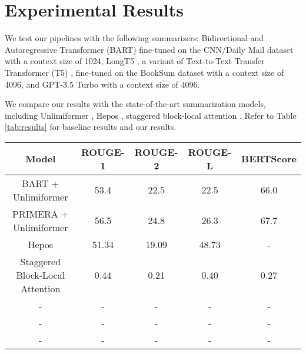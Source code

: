 \section{Experimental Results}

We test our pipelines with the following summarizers: Bidirectional and
Autoregressive Transformer (BART) \cite{lewis-etal-2020-bart} fine-tuned on the
CNN/Daily Mail dataset \cite{nallapati2016abstractive} with a context size of 1024,
LongT5 \cite{guo2021longt5}, a variant of Text-to-Text Transfer Transformer (T5)
\cite{raffel2020exploring}, fine-tuned on the BookSum dataset with a context size
of 4096, and GPT-3.5 Turbo \cite{brown2020language} with a context size of 4096.

We compare our results with the state-of-the-art summarization models, including
Unlimiformer \cite{bertsch2023unlimiformer}, Hepos \cite{huang-etal-2021-efficient},
staggered block-local attention \cite{phang2022investigating}.
Refer to Table \ref{tab:results} for baseline results and our results.

\begin{table*}[!ht]
	\centering

	\begin{tabular}{c c c c c}
		\hline
		\textbf{Model} & \textbf{ROUGE-1} & \textbf{ROUGE-2} & \textbf{ROUGE-L} & \textbf{BERTScore} \\
		\hline
		BART + Unlimiformer & 53.4 & 22.5 & 22.5 & 66.0 \\
		PRIMERA + Unlimiformer & 56.5 & 24.8 & 26.3 & 67.7 \\
		Hepos & 51.34 & 19.09 & 48.73 & - \\
		Staggered Block-Local Attention & 0.44 & 0.21 & 0.40 & 0.27 \\
		\hline
		- & - & - & - & - \\
		- & - & - & - & - \\
		- & - & - & - & - \\
		\hline
	\end{tabular}

	\caption{Automatic evaluation results on GovReport dataset}
	\label{tab:results}
\end{table*}
